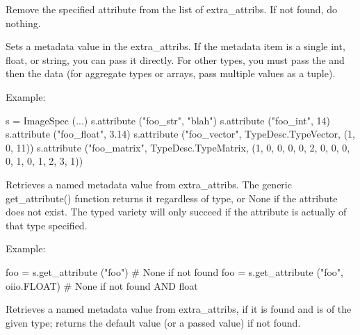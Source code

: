 Remove the specified attribute from the list of extra_attribs. If not found,
do nothing.
\apiend

Sets a metadata value in the {\cf extra_attribs}.  If the metadata item
is a single {\cf int}, {\cf float}, or {\cf string}, you can pass it
directly. For other types, you must pass the \TypeDesc and then the
data (for aggregate types or arrays, pass multiple values as a tuple).

\noindent Example:
\begin{code}
    s = ImageSpec (...)
    s.attribute ("foo_str", "blah")
    s.attribute ("foo_int", 14)
    s.attribute ("foo_float", 3.14)
    s.attribute ("foo_vector", TypeDesc.TypeVector, (1, 0, 11))
    s.attribute ("foo_matrix", TypeDesc.TypeMatrix,
                 (1, 0, 0, 0, 0, 2, 0, 0, 0, 0, 1, 0, 1, 2, 3, 1))
\end{code}
\apiend

Retrieves a named metadata value from {\cf extra_attribs}.  The generic
{\cf get_attribute()} function returns it regardless of type, or {\cf None}
if the attribute does not exist.  The typed variety will only succeed
if the attribute is actually of that type specified.

\noindent Example:
\begin{code}
    foo = s.get_attribute ("foo")   # None if not found
    foo = s.get_attribute ("foo", oiio.FLOAT)  # None if not found AND float
\end{code}
\apiend

Retrieves a named metadata value from {\cf extra_attribs}, if it is
found and is of the given type; returns the default value (or a passed
value) if not found.

